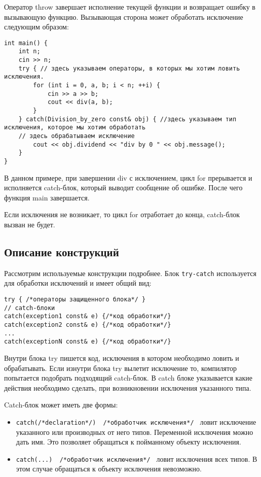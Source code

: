 Оператор throw завершает исполнение текущей функции и возвращает ошибку в вызывающую функцию. Вызывающая сторона может обработать исключение следующим образом:

\begin{verbatim}
int main() {
    int n;
    cin >> n;
    try { // здесь указываем операторы, в которых мы хотим ловить исключения.
        for (int i = 0, a, b; i < n; ++i) {
            cin >> a >> b;
            cout << div(a, b);
        }
    } catch(Division_by_zero const& obj) { //здесь указываем тип исключения, которое мы хотим обработать
    // здесь обрабатываем исключение
        cout << obj.dividend << "div by 0 " << obj.message();
    }
}
\end{verbatim}

В данном примере, при завершении div с исключением, цикл for прерывается и исполняется catch-блок, который выводит сообщение об ошибке. После чего функция main завершается.

Если исключения не возникает, то цикл for отработает до конца, catch-блок вызван не будет.

\subsection{Описание конструкций}
Рассмотрим используемые конструкции подробнее. Блок \texttt{try-catch} используется для обработки исключений и имеет общий вид:
\begin{verbatim}
try { /*операторы защищенного блока*/ }
// catch-блоки
catch(exception1 const& e) {/*код обработки*/}
catch(exception2 const& e) {/*код обработки*/}
...
catch(exceptionN const& e) {/*код обработки*/}

\end{verbatim}
Внутри блока try пишется код, исключения в котором необходимо ловить и обрабатывать. Если изнутри блока try вылетит исключение то, компилятор попытается подобрать подходящий catch-блок. В catch блоке указывается какие действия необходимо сделать, при возникновении исключения указанного типа.

Catch-блок может иметь две формы:
\begin{itemize}
    \item
    \texttt{catch(/*declaration*/) { /*обработчик исключения*/ }} ловит исключение указанного или производных от него типов. Переменной исключения можно дать имя. Это позволяет обращаться к пойманному объекту исключения.
    \item
    \texttt{catch(...) { /*обработчик исключения*/ }}
    ловит исключения всех типов. В этом случае обращаться к объекту исключения невозможно.
\end{itemize}

